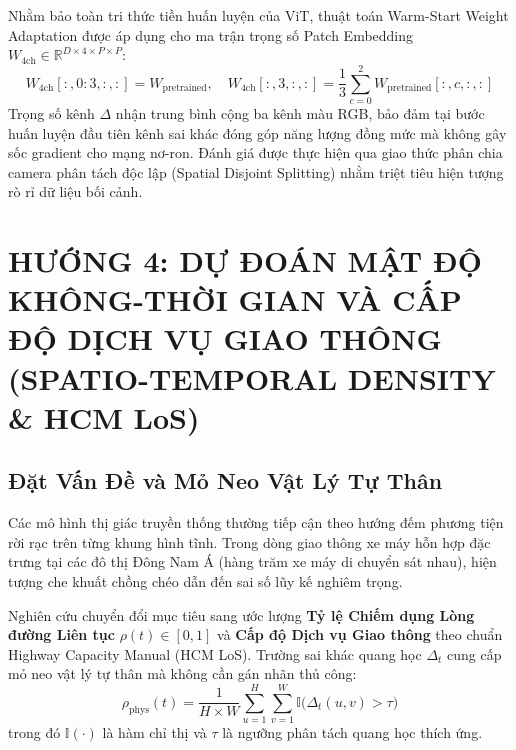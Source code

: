 \documentclass[11pt,a4paper]{article}
\begin{document}
Nhằm bảo toàn tri thức tiền huấn luyện của ViT, thuật toán Warm-Start Weight Adaptation được áp dụng cho ma trận trọng số Patch Embedding $W_{\text{4ch}} \in \mathbb{R}^{D \times 4 \times P \times P}$:
\begin{equation}
    W_{\text{4ch}}[:, 0:3, :, :] = W_{\text{pretrained}}, \quad W_{\text{4ch}}[:, 3, :, :] = \frac{1}{3} \sum_{c=0}^{2} W_{\text{pretrained}}[:, c, :, :]
\end{equation}
Trọng số kênh $\Delta$ nhận trung bình cộng ba kênh màu RGB, bảo đảm tại bước huấn luyện đầu tiên kênh sai khác đóng góp năng lượng đồng mức mà không gây sốc gradient cho mạng nơ-ron. Đánh giá được thực hiện qua giao thức phân chia camera phân tách độc lập (Spatial Disjoint Splitting) nhằm triệt tiêu hiện tượng rò rỉ dữ liệu bối cảnh.

\section{HƯỚNG 4: DỰ ĐOÁN MẬT ĐỘ KHÔNG-THỜI GIAN VÀ CẤP ĐỘ DỊCH VỤ GIAO THÔNG (SPATIO-TEMPORAL DENSITY \& HCM LoS)}

\subsection{Đặt Vấn Đề và Mỏ Neo Vật Lý Tự Thân}
Các mô hình thị giác truyền thống thường tiếp cận theo hướng đếm phương tiện rời rạc trên từng khung hình tĩnh. Trong dòng giao thông xe máy hỗn hợp đặc trưng tại các đô thị Đông Nam Á (hàng trăm xe máy di chuyển sát nhau), hiện tượng che khuất chồng chéo dẫn đến sai số lũy kế nghiêm trọng.

Nghiên cứu chuyển đổi mục tiêu sang ước lượng \textbf{Tỷ lệ Chiếm dụng Lòng đường Liên tục} $\rho(t) \in [0, 1]$ và \textbf{Cấp độ Dịch vụ Giao thông} theo chuẩn Highway Capacity Manual (HCM LoS). Trường sai khác quang học $\Delta_t$ cung cấp mỏ neo vật lý tự thân mà không cần gán nhãn thủ công:
\begin{equation}
    \rho_{\text{phys}}(t) = \frac{1}{H \times W} \sum_{u=1}^H \sum_{v=1}^W \mathbb{I}\big(\Delta_t(u, v) > \tau\big)
\end{equation}
trong đó $\mathbb{I}(\cdot)$ là hàm chỉ thị và $\tau$ là ngưỡng phân tách quang học thích ứng.
\end{document}
